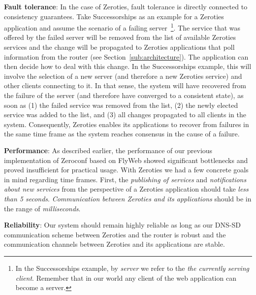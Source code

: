 \textbf{Fault tolerance}:
In the case of Zeroties, fault tolerance is directly connected to consistency guarantees.
Take Successorships as an example for a Zeroties application and assume the scenario of a failing server~\footnote{In the Successorships example, by \textit{server} we refer to the \textit{the currently serving client}. Remember that in our world any client of the web application can become a server.}.
The service that was offered by the failed server will be removed from the list of available Zeroties services and the change will be propagated to Zeroties applications that poll information from the router (see Section~\ref{sub:architecture}).
The application can then decide how to deal with this change.
In the Successorships example, this will involve the selection of a new server (and therefore a new Zeroties service) and other clients connecting to it.
In that sense, the system will have recovered from the failure of the server (and therefore have converged to a consistent state), as soon as (1) the failed service was removed from the list, (2) the newly elected service was added to the list, and (3) all changes propagated to all clients in the system.
Consequently, Zeroties enables its applications to recover from failures in the same time frame as the system reaches consensus in the cause of a failure.

\textbf{Performance}:
As described earlier, the performance of our previous implementation of Zeroconf based on FlyWeb showed significant bottlenecks and proved insufficient for practical usage.
With Zeroties we had a few concrete goals in mind regarding time frames. 
First, the \textit{publishing of services} and \textit{notifications about new services} from the perspective of a Zeroties application should take \textit{less than 5 seconds}.
\textit{Communication between Zeroties and its applications} should be in the range of \textit{milliseconds}.

\textbf{Reliability}:
Our system should remain highly reliable as long as our DNS-SD communication scheme between Zeroties and the router is robust and the communication channels between Zeroties and its applications are stable.

